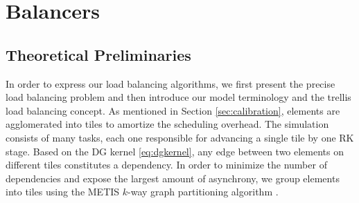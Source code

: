 \section{Balancers}
\label{sec:balancers}
\subsection{Theoretical Preliminaries}
In order to express our load balancing algorithms, we first present the precise load balancing problem and then introduce our model terminology and the trellis load balancing concept.
As mentioned in Section \ref{sec:calibration}, elements are agglomerated into tiles to amortize the scheduling overhead.  The simulation consists of many tasks, each one responsible for advancing a single tile by one RK stage.  Based on the DG kernel \eqref{eq:dgkernel}, any edge between two elements on different tiles constitutes a dependency. In order to minimize the number of dependencies and expose the largest amount of asynchrony, we group elements into tiles using the METIS $k$-way graph partitioning algorithm \cite{realmetis}.

